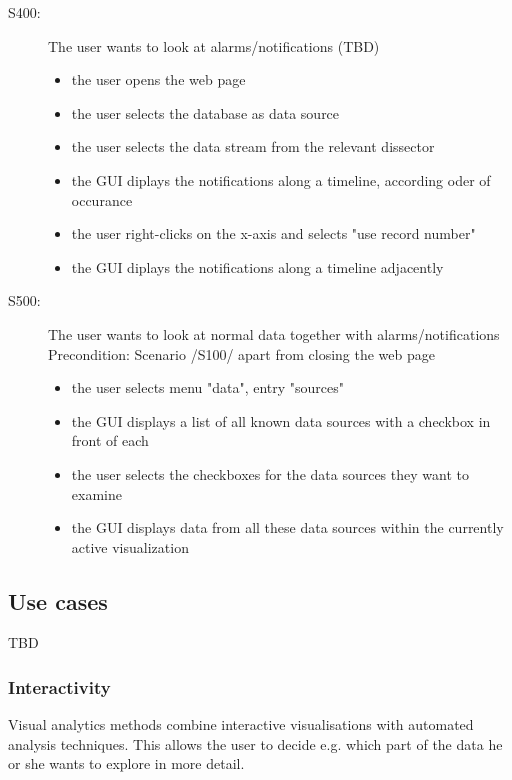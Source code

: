\documentclass[twoside, english, draft]{Pflichtenheft}
\begin{document}
\begin{description}
\item[S400:] The user wants to look at alarms/notifications (TBD)
\begin{itemize}
\item{the user opens the web page}
\item{the user selects the database as data source}
\item{the user selects the data stream from the relevant dissector}
\item{the GUI diplays the notifications along a timeline, according oder of occurance}
\item{the user right-clicks on the x-axis and selects "use record number"}
\item{the GUI diplays the notifications along a timeline adjacently}
\end{itemize}



\item[S500:] The user wants to look at normal data together with alarms/notifications
\\
Precondition: Scenario /S100/ apart from closing the web page
\begin{itemize}
\item{the user selects menu "data", entry "sources"}
\item{the GUI displays a list of all known data sources with a checkbox in front of each}
\item{the user selects the checkboxes for the data sources they want to examine}
\item{the GUI displays data from all these data sources within the currently active visualization}
\end{itemize}


\end{description}

\subsection{Use cases}

TBD

\subsubsection{Interactivity}

Visual analytics methods combine interactive visualisations with automated analysis
techniques. This allows the user to decide e.g. which part
of the data he or she wants to explore in more detail.
\end{document}
